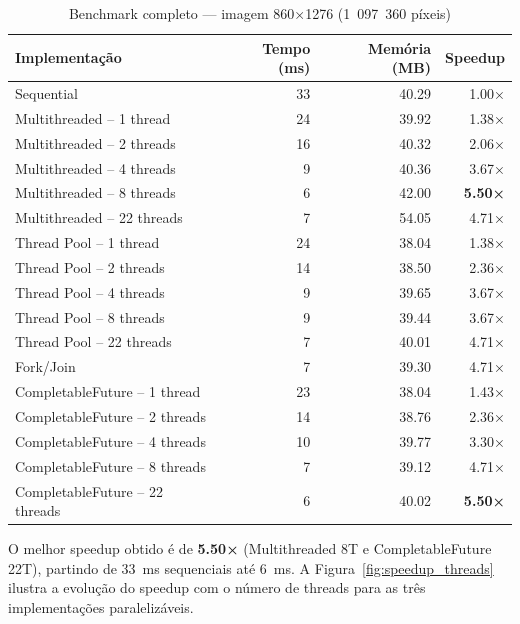 \documentclass[a4paper,11pt,openright,BCOR=15mm]{scrbook}
\begin{document}
\begin{table}[H]
    \centering
    \caption{Benchmark completo — imagem 860×1276 (1~097~360 píxeis)}
    \label{tab:benchmark}
    \begin{tabular}{lrrr}
        \toprule
        \textbf{Implementação} & \textbf{Tempo (ms)} & \textbf{Memória (MB)} & \textbf{Speedup} \\
        \midrule
        Sequential                      & 33 & 40.29 & 1.00× \\
        \midrule
        Multithreaded -- 1 thread       & 24 & 39.92 & 1.38× \\
        Multithreaded -- 2 threads      & 16 & 40.32 & 2.06× \\
        Multithreaded -- 4 threads      &  9 & 40.36 & 3.67× \\
        Multithreaded -- 8 threads      &  6 & 42.00 & \textbf{5.50×} \\
        Multithreaded -- 22 threads     &  7 & 54.05 & 4.71× \\
        \midrule
        Thread Pool -- 1 thread         & 24 & 38.04 & 1.38× \\
        Thread Pool -- 2 threads        & 14 & 38.50 & 2.36× \\
        Thread Pool -- 4 threads        &  9 & 39.65 & 3.67× \\
        Thread Pool -- 8 threads        &  9 & 39.44 & 3.67× \\
        Thread Pool -- 22 threads       &  7 & 40.01 & 4.71× \\
        \midrule
        Fork/Join                       &  7 & 39.30 & 4.71× \\
        \midrule
        CompletableFuture -- 1 thread   & 23 & 38.04 & 1.43× \\
        CompletableFuture -- 2 threads  & 14 & 38.76 & 2.36× \\
        CompletableFuture -- 4 threads  & 10 & 39.77 & 3.30× \\
        CompletableFuture -- 8 threads  &  7 & 39.12 & 4.71× \\
        CompletableFuture -- 22 threads &  6 & 40.02 & \textbf{5.50×} \\
        \bottomrule
    \end{tabular}
\end{table}

O melhor speedup obtido é de \textbf{5.50×} (Multithreaded 8T e CompletableFuture 22T), partindo de 33~ms sequenciais até 6~ms. A Figura~\ref{fig:speedup_threads} ilustra a evolução do speedup com o número de threads para as três implementações paralelizáveis.
\end{document}
